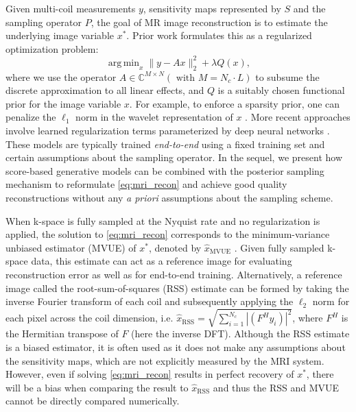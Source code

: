 \documentclass{article}
\newcounter{example}[section]
\newcommand{\norm}[1]{\|#1\|}
\newcommand{\C}{\mathbb{C}}
\DeclareMathOperator*{\argmin}{arg\,min}
\begin{document}
Given multi-coil measurements $y$, sensitivity maps represented by $S$ and the sampling operator $P$, the goal of MR image reconstruction is to estimate the underlying image variable $x^*$. Prior work formulates this as a regularized optimization problem:
\begin{equation}
    \argmin_{x} \norm{y - A x}_2^2 + \lambda Q(x),
    \label{eq:mri_recon}
\end{equation}
\noindent where we use the operator $A\in\C^{M\times N} (\text{ with } M=N_c \cdot L)$ to subsume the discrete approximation to all linear effects, and $Q$ is a suitably chosen functional prior for the image variable $x$. For example, to enforce a sparsity prior, one can penalize the $\ell_1$ norm in the wavelet representation of $x$ \cite{lustig2007sparse}. More recent approaches involve learned regularization terms parameterized by deep neural networks \cite{schlemper2017deep,hammernik2018learning,aggarwal2018modl}. These models are typically trained \textit{end-to-end} using a fixed training set and certain assumptions about the sampling operator. In the sequel, we present how score-based generative models can be combined with the posterior sampling~\cite{jalal2021instance} mechanism to reformulate \eqref{eq:mri_recon} and achieve good quality reconstructions without any \textit{a priori} assumptions about the sampling scheme. 

When k-space is fully sampled at the Nyquist rate and no regularization is applied, the solution to \eqref{eq:mri_recon} corresponds to the minimum-variance unbiased estimator (MVUE) of $x^*$, denoted by $\hat{x}_{\mathrm{MVUE}}$ \cite{pruessmann1999sense}. Given fully sampled k-space data, this estimate can act as a reference image for evaluating reconstruction error as well as for end-to-end training.
Alternatively, a reference image called the root-sum-of-squares (RSS) estimate can be formed
by taking the inverse Fourier transform of each coil and subsequently applying the $\ell_2$ norm for each pixel across the coil dimension, i.e. $\hat{x}_{\mathrm{RSS}} =\sqrt{\sum_{i=1}^{N_c} \left|\left(F^H y_i\right)\right|^2}$,
where $F^H$ is the Hermitian transpose of $F$ (here the inverse DFT).
Although the RSS estimate is a biased estimator, it is often used as it does not make any assumptions about the sensitivity maps, which are not explicitly measured by the MRI system.
However, even if solving \eqref{eq:mri_recon} results in perfect recovery of $x^*$, there will be a bias when comparing the result to $\hat{x}_{\mathrm{RSS}}$ and thus the RSS and MVUE cannot be directly compared numerically.
\end{document}
